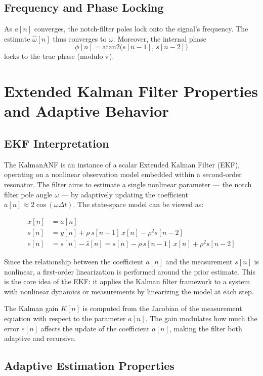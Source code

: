 \documentclass{article}
\begin{document}
\subsection{Frequency and Phase Locking}
As \(a[n]\) converges, the notch-filter poles lock onto the signal’s frequency.  The estimate \(\hat\omega[n]\) thus converges to \(\omega\).  Moreover, the internal phase
\[
\phi[n] = \mathrm{atan2}\bigl(s[n-1],\,s[n-2]\bigr)
\]
locks to the true phase (modulo \(\pi\)).

\section{Extended Kalman Filter Properties and Adaptive Behavior}

\subsection{EKF Interpretation}

The KalmanANF is an instance of a scalar Extended Kalman Filter (EKF), operating on a nonlinear observation model embedded within a second-order resonator. The filter aims to estimate a single nonlinear parameter — the notch filter pole angle \( \omega \) — by adaptively updating the coefficient \( a[n] \approx 2 \cos(\omega \Delta t) \). The state-space model can be viewed as:

\begin{align*}
x[n] &= a[n] \\
s[n] &= y[n] + \rho\,s[n-1]\,x[n] - \rho^2 s[n-2] \\
e[n] &= s[n] - \hat{s}[n] = s[n] - \rho\,s[n-1]\,x[n] + \rho^2 s[n-2]
\end{align*}

Since the relationship between the coefficient \( a[n] \) and the measurement \( s[n] \) is nonlinear, a first-order linearization is performed around the prior estimate. This is the core idea of the EKF: it applies the Kalman filter framework to a system with nonlinear dynamics or measurements by linearizing the model at each step.

The Kalman gain \( K[n] \) is computed from the Jacobian of the measurement equation with respect to the parameter \( a[n] \). The gain modulates how much the error \( e[n] \) affects the update of the coefficient \( a[n] \), making the filter both adaptive and recursive.

\subsection{Adaptive Estimation Properties}
\end{document}

